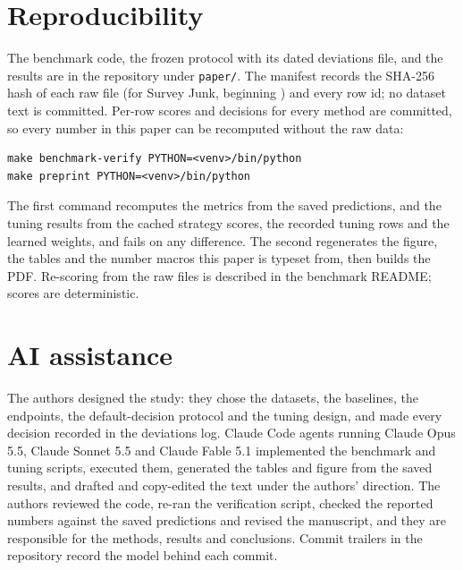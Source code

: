 \documentclass[10pt,twocolumn]{article}
\newcommand{\code}[1]{\texttt{#1}}
\newcommand{\SJ}{Survey Junk}
\begin{document}
\section{Reproducibility}
\label{sec:repro}

The benchmark code, the frozen protocol with its dated deviations file,
and the results are in the repository under \code{paper/}. The manifest
records the SHA-256 hash of each raw file (for \SJ{}, beginning
\code{\shaA}) and every row id; no dataset text is committed. Per-row
scores and decisions for every method are committed, so every number in
this paper can be recomputed without the raw data:
\begin{small}
\begin{verbatim}
make benchmark-verify PYTHON=<venv>/bin/python
make preprint PYTHON=<venv>/bin/python
\end{verbatim}
\end{small}
The first command recomputes the metrics from the saved predictions, and
the tuning results from the cached strategy scores, the recorded tuning
rows and the learned weights, and fails on any difference. The second regenerates the figure, the tables
and the number macros this paper is typeset from, then builds the PDF.
Re-scoring from the raw files is described in the benchmark README;
scores are deterministic.

\section*{AI assistance}

The authors designed the study: they chose the datasets, the baselines,
the endpoints, the default-decision protocol and the tuning design, and
made every decision recorded in the deviations log. Claude Code agents
running Claude Opus 5.5, Claude Sonnet 5.5 and Claude Fable 5.1
implemented the benchmark and tuning scripts, executed them, generated the
tables and figure from the saved results, and drafted and copy-edited the
text under the authors' direction. The authors reviewed the code, re-ran
the verification script, checked the reported numbers against the saved
predictions and revised the manuscript, and they are responsible for the
methods, results and conclusions. Commit trailers in the repository
record the model behind each commit.




\clearpage
\appendix
\end{document}
